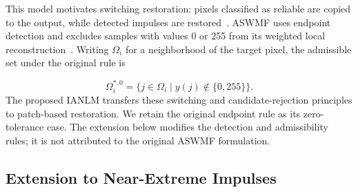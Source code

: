 \documentclass[pdflatex,iicol,sn-mathphys-num]{sn-jnl}
\newif\ifshowportuguese
\newcommand{\pt}[1]{\ifshowportuguese\par\begingroup\small\color{blue!55!black}\noindent\textbf{PT: }#1\par\endgroup\fi}
\begin{document}
This model motivates switching restoration: pixels classified as reliable are copied to the output, while detected impulses are restored~\cite{wang1999progressive}. ASWMF uses endpoint detection and excludes samples with values 0 or 255 from its weighted local reconstruction~\cite{thanh2020adaptive}. Writing $\Omega_i$ for a neighborhood of the target pixel, the admissible set under the original rule is
\pt{Esse modelo motiva a restauração com chaveamento: pixels classificados como confiáveis são copiados para a saída, enquanto impulsos detectados são restaurados~\cite{wang1999progressive}. O ASWMF utiliza detecção nos extremos e exclui amostras com valores 0 ou 255 de sua reconstrução local ponderada~\cite{thanh2020adaptive}. Denotando por $\Omega_i$ uma vizinhança do pixel alvo, o conjunto admissível sob a regra original é}
\begin{equation}
\Omega_i^{*,0}=\{j\in\Omega_i\mid y(j)\notin\{0,255\}\}.
\label{eq:valid_candidates_background}
\end{equation}
The proposed IANLM transfers these switching and candidate-rejection principles to patch-based restoration. We retain the original endpoint rule as its zero-tolerance case. The extension below modifies the detection and admissibility rules; it is not attributed to the original ASWMF formulation.
\pt{O IANLM proposto transfere esses princípios de chaveamento e rejeição de candidatos para a restauração baseada em patches. Mantemos a regra original nos extremos como seu caso de tolerância zero. A extensão a seguir modifica as regras de detecção e admissibilidade; ela não é atribuída à formulação original do ASWMF.}

\subsection{Extension to Near-Extreme Impulses}
\label{subsec:tolerance_extension}
\end{document}
